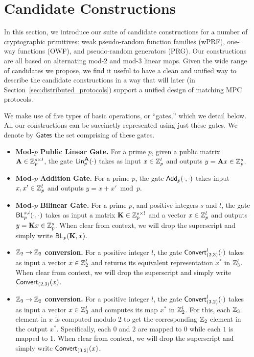 
\section{Candidate Constructions}
\label{sec:candidates}
In this section, we introduce our suite of candidate constructions for a number of cryptographic primitives: weak pseudo-random function families (wPRF), one-way functions (OWF), and pseudo-random generators (PRG). Our constructions are all based on alternating mod-2 and mod-3 linear maps. 
Given the wide range of candidates we propose, we find it useful to have a clean and unified way to describe the candidate constructions in a way that will later (in Section~\ref{sec:distributed_protocols}) support a unified design of matching MPC protocols.  

We make use of five types of basic operations, or ``gates,'' which we detail below. All our constructions can be succinctly represented using just these gates. We denote by $\textnormal{\textsf{Gates}}$ the set comprising of these gates.

\begin{itemize}
    \item \textbf{Mod-$p$ Public Linear Gate.}
    For a prime $p$, given a public matrix $\mat{A} \in \Z_p^{s \times l}$, the gate $\LMap^\mat{A}_p(\cdot)$ takes as input $x \in \mathbb{Z}_p^l$ and outputs $y = \mat{A}x \in \Z_p^s$.

    \item \textbf{Mod-$p$ Addition Gate.}
    For a prime $p$, the gate $\textnormal{\textsf{Add}}_p(\cdot,\cdot)$ takes input $x,x' \in \mathbb{Z}_p^{l}$ and outputs $y = x + x' \bmod p$.

    \item \textbf{Mod-$p$ Bilinear Gate.}
    For a prime $p$, and positive integers $s$ and $l$, the gate $\textnormal{\textsf{BL}}_p^{s,l}(\cdot, \cdot)$ takes as input a matrix $\mat{K} \in \Z_p^{s \times l}$ and a vector $x \in \mathbb{Z}_p^l$ and outputs $y = \mat{K}x \in \Z_p^s$. When clear from context, we will drop the superscript and simply write $\BLMap_p(\mat{K}, x)$.
    
    \item \textbf{$\mathbb{Z}_2 \to \mathbb{Z}_3$ conversion.} For a positive integer $l$, the gate $\textnormal{\textsf{Convert}}^l_{(2,3)}(\cdot)$ takes as input a vector $x \in \mathbb{Z}_2^l$ and returns its equivalent representation $x^*$ in $\mathbb{Z}_3^l$. When clear from context, we will drop the superscript and simply write $\textnormal{\textsf{Convert}}_{(2,3)}(x)$.

    \item \textbf{$\mathbb{Z}_3 \to \mathbb{Z}_2$ conversion.} For a positive integer $l$, the gate $\textnormal{\textsf{Convert}}^l_{(3,2)}(\cdot)$ takes as input a vector $x \in \mathbb{Z}_3^l$ and computes its map $x^*$ in $\mathbb{Z}_2^l$. For this, each $\mathbb{Z}_3$ element in $x$ is computed modulo 2 to get the corresponding $\mathbb{Z}_2$ element in the output $x^*$. Specifically, each $0$ and $2$ are mapped to $0$ while each $1$ is mapped to $1$. When clear from context, we will drop the superscript and simply write $\textnormal{\textsf{Convert}}_{(3,2)}(x)$.
\end{itemize}


